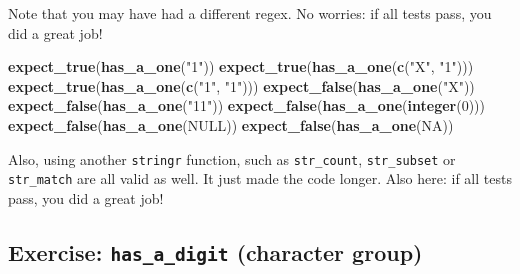 \documentclass[]{book}
\newenvironment{Shaded}{}{}
\newcommand{\ControlFlowTok}[1]{\textcolor[rgb]{0.00,0.44,0.13}{\textbf{#1}}}
\newcommand{\DecValTok}[1]{\textcolor[rgb]{0.25,0.63,0.44}{#1}}
\newcommand{\KeywordTok}[1]{\textcolor[rgb]{0.00,0.44,0.13}{\textbf{#1}}}
\newcommand{\NormalTok}[1]{#1}
\newcommand{\OperatorTok}[1]{\textcolor[rgb]{0.40,0.40,0.40}{#1}}
\newcommand{\OtherTok}[1]{\textcolor[rgb]{0.00,0.44,0.13}{#1}}
\newcommand{\StringTok}[1]{\textcolor[rgb]{0.25,0.44,0.63}{#1}}
\begin{document}
\begin{Shaded}
\end{Shaded}

Note that you may have had a different regex.
No worries: if all tests pass, you did a great job!

\begin{Shaded}
\begin{Highlighting}[]
\KeywordTok{expect_true}\NormalTok{(}\KeywordTok{has_a_one}\NormalTok{(}\StringTok{"1"}\NormalTok{))}
\KeywordTok{expect_true}\NormalTok{(}\KeywordTok{has_a_one}\NormalTok{(}\KeywordTok{c}\NormalTok{(}\StringTok{"X"}\NormalTok{, }\StringTok{"1"}\NormalTok{)))}
\KeywordTok{expect_true}\NormalTok{(}\KeywordTok{has_a_one}\NormalTok{(}\KeywordTok{c}\NormalTok{(}\StringTok{"1"}\NormalTok{, }\StringTok{"1"}\NormalTok{)))}
\KeywordTok{expect_false}\NormalTok{(}\KeywordTok{has_a_one}\NormalTok{(}\StringTok{"X"}\NormalTok{))}
\KeywordTok{expect_false}\NormalTok{(}\KeywordTok{has_a_one}\NormalTok{(}\StringTok{"11"}\NormalTok{))}
\KeywordTok{expect_false}\NormalTok{(}\KeywordTok{has_a_one}\NormalTok{(}\KeywordTok{integer}\NormalTok{(}\DecValTok{0}\NormalTok{)))}
\KeywordTok{expect_false}\NormalTok{(}\KeywordTok{has_a_one}\NormalTok{(}\OtherTok{NULL}\NormalTok{))}
\KeywordTok{expect_false}\NormalTok{(}\KeywordTok{has_a_one}\NormalTok{(}\OtherTok{NA}\NormalTok{))}
\end{Highlighting}
\end{Shaded}

Also, using another \texttt{stringr} function, such as \texttt{str\_count}, \texttt{str\_subset}
or \texttt{str\_match} are all valid as well. It just made the code longer.
Also here: if all tests pass, you did a great job!

\hypertarget{exercise-has_a_digit-character-group}{%
\subsection{\texorpdfstring{Exercise: \texttt{has\_a\_digit} (character group)}{Exercise: has\_a\_digit (character group)}}\label{exercise-has_a_digit-character-group}}
\end{document}

